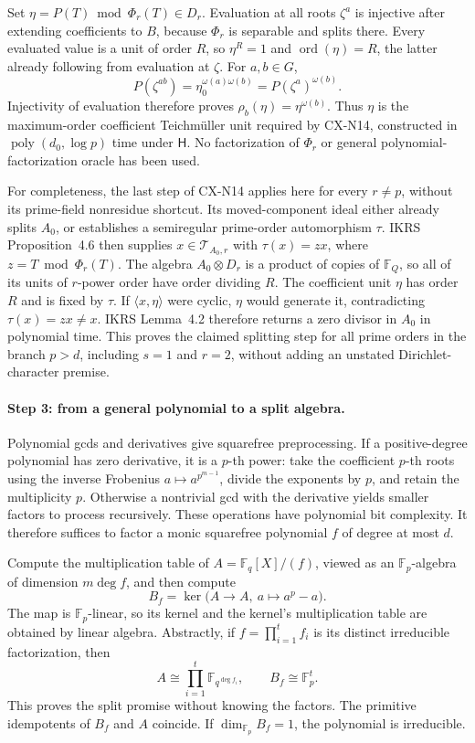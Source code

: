Set \(\eta=P(T)\bmod\Phi_r(T)\in D_r\).
Evaluation at all roots \(\zeta^a\) is injective after extending
coefficients to \(B\), because \(\Phi_r\) is separable and
splits there.
Every evaluated value is a unit of order \(R\), so
\(\eta^R=1\) and \(\operatorname{ord}(\eta)=R\), the latter
already following from evaluation at \(\zeta\).
For \(a,b\in G\),
\[
 P(\zeta^{ab})
 =\eta_0^{\omega(a)\omega(b)}
 =P(\zeta^a)^{\omega(b)}.
\]
Injectivity of evaluation therefore proves
\(\rho_b(\eta)=\eta^{\omega(b)}\).
Thus \(\eta\) is the maximum-order coefficient Teichm\"uller
unit required by CX-N14, constructed in
\(\operatorname{poly}(d_0,\log p)\) time under \(\mathsf H\).
No factorization of \(\Phi_r\) or general polynomial-factorization
oracle has been used.

For completeness, the last step of CX-N14 applies here for
every \(r\ne p\), without its prime-field nonresidue shortcut.
Its moved-component ideal either already splits \(A_0\), or
establishes a semiregular prime-order automorphism \(\tau\).
IKRS Proposition~4.6 then supplies
\(x\in\mathcal T_{A_0,r}\) with
\(\tau(x)=z x\), where \(z=T\bmod\Phi_r(T)\).
The algebra \(A_0\otimes D_r\) is a product of copies of
\(\mathbb F_Q\), so all of its units of \(r\)-power order have
order dividing \(R\).
The coefficient unit \(\eta\) has order \(R\) and is fixed
by \(\tau\). If \(\langle x,\eta\rangle\) were cyclic,
\(\eta\) would generate it, contradicting
\(\tau(x)=zx\ne x\).
IKRS Lemma~4.2 therefore returns a zero divisor in \(A_0\)
in polynomial time.
This proves the claimed splitting step for all prime orders in
the branch \(p>d\), including \(s=1\) and \(r=2\), without
adding an unstated Dirichlet-character premise.

\paragraph{Step 3: from a general polynomial to a split algebra.}
Polynomial gcds and derivatives give squarefree preprocessing.
If a positive-degree polynomial has zero derivative, it is a
\(p\)-th power: take the coefficient \(p\)-th roots using the
inverse Frobenius \(a\mapsto a^{p^{m-1}}\), divide the exponents
by \(p\), and retain the multiplicity \(p\).
Otherwise a nontrivial gcd with the derivative yields smaller
factors to process recursively.
These operations have polynomial bit complexity.
It therefore suffices to factor a monic squarefree polynomial
\(f\) of degree at most \(d\).

Compute the multiplication table of
\(A=\mathbb F_q[X]/(f)\), viewed as an
\(\mathbb F_p\)-algebra of dimension \(m\deg f\), and then
compute
\[
 B_f=\ker\bigl(A\longrightarrow A,\ a\longmapsto a^p-a\bigr).
\]
The map is \(\mathbb F_p\)-linear, so its kernel and the kernel's
multiplication table are obtained by linear algebra.
Abstractly, if \(f=\prod_{i=1}^t f_i\) is its distinct
irreducible factorization, then
\[
 A\cong\prod_{i=1}^t\mathbb F_{q^{\deg f_i}},
 \qquad B_f\cong\mathbb F_p^t.
\]
This proves the split promise without knowing the factors.
The primitive idempotents of \(B_f\) and \(A\) coincide.
If \(\dim_{\mathbb F_p}B_f=1\), the polynomial is irreducible.

